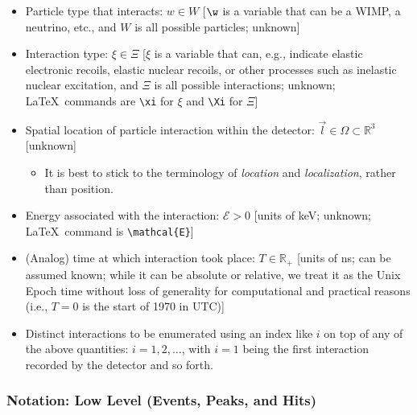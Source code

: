 \documentclass[]{article}
\providecommand{\tightlist}{%
  \setlength{\itemsep}{0pt}\setlength{\parskip}{0pt}}
\begin{document}
\begin{itemize}
\tightlist
\item
  Particle type that interacts:
  \(w \in W\)
  {[}\(\w\) is a variable that can be a WIMP, a neutrino, etc., and \(W\) is all possible particles; unknown{]} 

\item
  Interaction type:
  \(\xi \in \Xi\)
  {[}\(\xi\) is a variable that can, e.g., indicate elastic electronic recoils, elastic nuclear recoils, or other processes such as inelastic nuclear excitation, and \(\Xi\) is all possible interactions; unknown; {\color{blue}\LaTeX~commands are \verb|\xi| for $\xi$ and \verb|\Xi| for $\Xi$}{]}

\item
  Spatial location of particle interaction within the detector:
  \(\vec{l} \in \Omega \subset \mathbb{R}^3\) {[}unknown{]}

  \begin{itemize}
  \tightlist
  \item
    It is best to stick to the terminology of \emph{location} and \emph{localization}, rather than position.
  \end{itemize}
\item
  Energy associated with the interaction: \(\mathcal{E} > 0\)
  {[}units of keV; unknown; \LaTeX~command is \verb|\mathcal{E}|{]}
\item
  (Analog) time at which interaction took place: \(T \in \mathbb{R}_+\)
  {[}units of ns; can be assumed known; while it can be absolute or relative, we treat it as the Unix Epoch time without loss of generality for computational and practical reasons (i.e., \(T=0\) is the start of 1970 in UTC){]}
\item
  Distinct interactions to be enumerated using an index like \(i\) on top of any of the above quantities: \(i = 1,2,\dots\), with \(i = 1\) being the first interaction recorded by the detector and so forth.
\end{itemize}

\subsubsection{Notation: Low Level (Events, Peaks, and Hits)}
\end{document}
